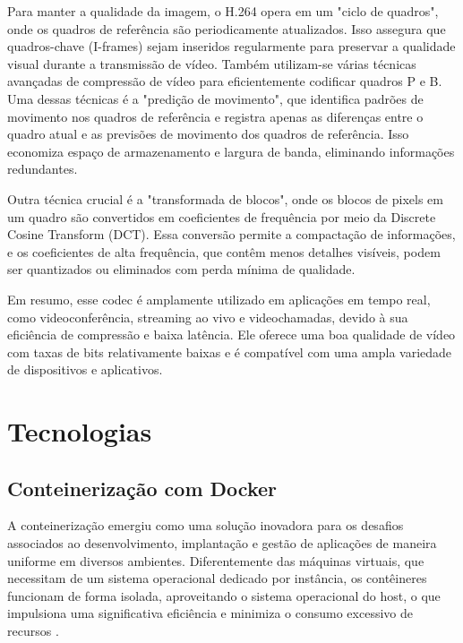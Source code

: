 \documentclass[12pt, %
openright, 
oneside, %
a4paper,    %
brazil]{facom-ufu-abntex2}
\begin{document}
Para manter a qualidade da imagem, o H.264 opera em um "ciclo de quadros", onde
os quadros de referência são periodicamente atualizados. Isso assegura que
quadros-chave (I-frames) sejam inseridos regularmente para preservar a
qualidade visual durante a transmissão de vídeo. Também utilizam-se várias
técnicas avançadas de compressão de vídeo para eficientemente codificar quadros
P e B. Uma dessas técnicas é a "predição de movimento", que identifica padrões
de movimento nos quadros de referência e registra apenas as diferenças entre o
quadro atual e as previsões de movimento dos quadros de referência. Isso
economiza espaço de armazenamento e largura de banda, eliminando informações
redundantes.

Outra técnica crucial é a "transformada de blocos", onde os blocos de pixels em
um quadro são convertidos em coeficientes de frequência por meio da Discrete
Cosine Transform (DCT). Essa conversão permite a compactação de informações, e
os coeficientes de alta frequência, que contêm menos detalhes visíveis, podem
ser quantizados ou eliminados com perda mínima de qualidade. \cite{1626286}

Em resumo, esse codec é amplamente utilizado em aplicações em tempo real, como
videoconferência, streaming ao vivo e videochamadas, devido à sua eficiência de
compressão e baixa latência. Ele oferece uma boa qualidade de vídeo com taxas
de bits relativamente baixas e é compatível com uma ampla variedade de
dispositivos e aplicativos.



\section{Tecnologias}

\subsection{Conteinerização com Docker}

A conteinerização emergiu como uma solução inovadora para os desafios
associados ao desenvolvimento, implantação e gestão de aplicações de maneira
uniforme em diversos ambientes. Diferentemente das máquinas virtuais, que
necessitam de um sistema operacional dedicado por instância, os contêineres
funcionam de forma isolada, aproveitando o sistema operacional do host, o que
impulsiona uma significativa eficiência e minimiza o consumo excessivo de
recursos \cite{burns2018designing}.
\end{document}
